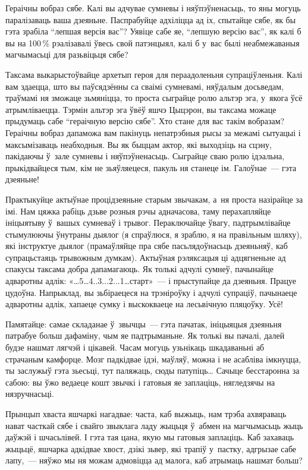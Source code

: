 Гераічны вобраз сябе. Калі вы адчувае сумневы і няўпэўненасьць, то яны могуць паралізаваць ваша дзеяньне. Паспрабуйце адхіліцца ад іх, спытайце сябе, як бы гэта зрабіла ``лепшая версія вас''? Уявіце сабе яе, ``лепшую версію вас'', як калі б вы на 100\,\% рэалізавалі ўвесь свой патэнцыял, калі б у~вас былі неабмежаваныя магчымасьці для разьвіцьця сябе?

Таксама выкарыстоўвайце архетып героя для пераадоленьня супраціўленьня. Калі вам здаецца, што вы паўсядзённы са сваімі сумневамі, няўдалым досьведам, траўмамі ня зможаце зьмяніцца, то проста сыграйце ролю альтэр эга, у~якога ўсё атрымліваецца. Тэрмін альтэр эга ўвёў яшчэ Цыцэрон, вы таксама можаце прыдумаць сабе ``гераічную версію сябе''. Хто стане для вас такім вобразам? Гераічны вобраз дапаможа вам пакінуць непатрэбныя рысы за межамі сытуацыі і максымізаваць неабходныя. Вы як быццам актор, які выходзіць на сцэну, пакідаючы ў~зале сумневы і няўпэўненасьць. Сыграйце сваю ролю ідэальна, прыкідвайцеся тым, кім не зьяўляецеся, пакуль ня станеце ім. Галоўнае~--- гэта дзеяньне!

Практыкуйце актыўнае процідзеяньне старым звычакам, а~ня проста назірайце за імі. Нам цяжка рабіць дзьве розныя рэчы адначасова, таму перахапляйце ініцыятыву ў~вашых сумневаў і трывог. Пераключайце ўвагу, падтрымлівайце стымулюючы ўнутраны дыялог (я спраўлюся, я зраблю, я на правільным шляху), які інструктуе дыялог (прамаўляйце пра сябе пасьлядоўнасьць дзеяньняў, каб супрацьстаяць трывожным думкам). Актыўная рэляксацыя ці адцягненьне ад спакусы таксама добра дапамагаюць. Як толькі адчулі сумнеў, пачынайце адваротны адлік: «…5…4..3...2...1…старт»~--- і прыступайце да дзеяньня. Працуе цудоўна. Напрыклад, вы зьбіраецеся на трэніроўку і адчулі супраціў, пачынаеце адваротны адлік, хапаеце сумку і выскокваеце на лесьвічную пляцоўку. Усё!

Памятайце: самае складанае ў~звычцы~--- гэта пачатак, ініцыяцыя дзеяньня патрабуе больш дафаміну, чым яе падтрыманьне. Як толькі вы пачалі, далей будзе нашмат лягчэй і цікавей. Часам могуць узьнікаць шкадаваньні аб страчаным камфорце. Мозг падкідвае ідэі, маўляў, можна і не асабліва імкнуцца, ты заслужыў гэта зьесьці, тут паляжаць, сюды патупіць… Сачыце бесстаронна за сабою: вы ўжо ведаеце кошт звычкі і гатовыя яе заплаціць, нягледзячы на нязручнасьці.

Прынцып хваста яшчаркі нагадвае: часта, каб выжыць, нам трэба ахвяраваць нават часткай сябе і свайго звыклага ладу жыцьця ў~абмен на магчымасьць жыць даўжэй і шчасьлівей. І гэта тая цана, якую мы гатовыя заплаціць. Каб захаваць жыцьцё, яшчарка адкідвае хвост, дзікі зьвер, які трапіў у~пастку, адгрызае сабе лапу,~--- няўжо мы ня можам адмовіцца ад малога, каб атрымаць нашмат больш?

